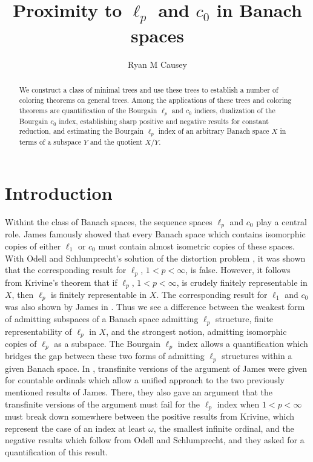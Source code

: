 \documentclass[12pt]{amsart}
\title{Proximity to $\ell_p$ and $c_0$ in Banach spaces}
\author[RM Causey]{Ryan M Causey}
\theoremstyle{definition}
\begin{document}
\begin{abstract} We construct a class of minimal trees and use these trees to establish a number of coloring theorems on general trees.  Among the applications of these trees and coloring theorems are quantification of the Bourgain $\ell_p$ and $c_0$ indices, dualization of the Bourgain $c_0$ index, establishing sharp positive and negative results for constant reduction, and estimating the Bourgain $\ell_p$ index of an arbitrary Banach space $X$ in terms of a subspace $Y$ and the quotient $X/Y$.  



\end{abstract} 



\maketitle

\tableofcontents





\section{Introduction}


Withint the class of Banach spaces, the sequence spaces $\ell_p$ and $c_0$ play a central role.  James \cite{James} famously showed that every Banach space which contains isomorphic copies of either $\ell_1$ or $c_0$ must contain almost isometric copies of these spaces.  With Odell and Schlumprecht's solution of the distortion problem \cite{OS}, it was shown that the corresponding result for $\ell_p$, $1<p<\infty$, is false.   However, it follows from Krivine's theorem \cite{K} that if $\ell_p$, $1<p<\infty$, is crudely finitely representable in $X$, then $\ell_p$ is finitely representable in $X$. The corresponding result for $\ell_1$ and $c_0$ was also shown by James in \cite{James}.   Thus we see a difference between the weakest form of admitting subspaces of a Banach space admitting $\ell_p$ structure, finite representability of $\ell_p$ in $X$, and the strongest notion, admitting isomorphic copies of $\ell_p$ as a subspace.  The Bourgain $\ell_p$ index \cite{Bo} allows a quantification which bridges the gap between these two forms of admitting $\ell_p$ structures within a given Banach space.  In \cite{JO}, transfinite versions of the argument of James were given for countable ordinals which allow a unified approach to the two previously mentioned results of James.  There, they also gave an argument that the transfinite versions of the argument must fail for the $\ell_p$ index when $1<p<\infty$ must break down somewhere between the positive results from Krivine, which represent the case of an index at least $\omega$, the smallest infinite ordinal, and the negative results which follow from Odell and Schlumprecht, and they asked for a quantification of this result.  
\end{document}
